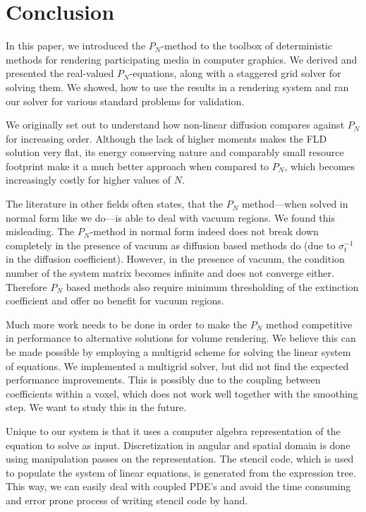 \section{Conclusion}
\label{sec:conclusion}

In this paper, we introduced the $P_N$-method to the toolbox of deterministic methods for rendering participating media in computer graphics. We derived and presented the real-valued $P_N$-equations, along with a staggered grid solver for solving them. We showed, how to use the results in a rendering system and ran our solver for various standard problems for validation.

We originally set out to understand how non-linear diffusion compares against $P_N$ for increasing order. Although the lack of higher moments makes the FLD solution very flat, its energy conserving nature and comparably small resource footprint make it a much better approach when compared to $P_N$, which becomes increasingly costly for higher values of $N$.

\vspace{0.5in}

The literature in other fields often states, that the $P_N$ method---when solved in normal form like we do---is able to deal with vacuum regions. We found this misleading. The $P_N$-method in normal form indeed does not break down completely in the presence of vacuum as diffusion based methods do (due to $\sigma_t^{-1}$ in the diffusion coefficient). However, in the presence of vacuum, the condition number of the system matrix becomes infinite and does not converge either. Therefore $P_N$ based methods also require minimum thresholding of the extinction coefficient and offer no benefit for vacuum regions.

Much more work needs to be done in order to make the $P_N$ method competitive in performance to alternative solutions for volume rendering. We believe this can be made possible by employing a multigrid scheme for solving the linear system of equations. We implemented a multigrid solver, but did not find the expected performance improvements. This is possibly due to the coupling between coefficients within a voxel, which does not work well together with the smoothing step. We want to study this in the future.

Unique to our system is that it uses a computer algebra representation of the equation to solve as input. Discretization in angular and spatial domain is done using manipulation passes on the representation. The stencil code, which is used to populate the system of linear equations, is generated from the expression tree. This way, we can easily deal with coupled PDE's and avoid the time consuming and error prone process of writing stencil code by hand.

